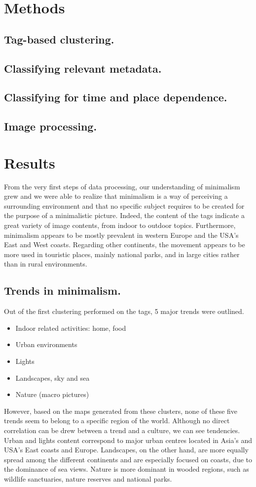 \documentclass[sigconf]{acmart}
\begin{document}
\section{Methods}
\subsection*{Tag-based clustering.}
\subsection*{Classifying relevant metadata.}
\subsection*{Classifying for time and place dependence.}
\subsection*{Image processing.}
\section{Results}
From the very first steps of data processing, our understanding of minimalism grew and we were able to realize that minimalism is a way of perceiving a surrounding environment and that no specific subject requires to be created for the purpose of a minimalistic picture. Indeed, the content of the tags indicate a great variety of image contents, from indoor to outdoor topics. Furthermore, minimalism appears to be mostly prevalent in western Europe and the USA's East and West coasts. Regarding other continents, the movement appears to be more used in touristic places, mainly national parks, and in large cities rather than in rural environments.
\subsection*{Trends in minimalism.}
Out of the first clustering performed on the tags, 5 major trends were outlined.
	\begin{itemize}
		\item Indoor related activities: home, food
		\item Urban environments
		\item Lights
		\item Landscapes, sky and sea
		\item Nature (macro pictures)
	\end{itemize}
However, based on the maps generated from these clusters, none of these five trends seem to belong to a specific region of the world. Although no direct correlation can be drew between a trend and a culture, we can see tendencies. Urban and lights content correspond to major urban centres located in Asia's and USA's East coasts and Europe. Landscapes, on the other hand, are more equally spread among the different continents and are especially focused on coasts, due to the dominance of sea views. Nature is more dominant in wooded regions, such as wildlife sanctuaries, nature reserves and national parks. 
\end{document}
